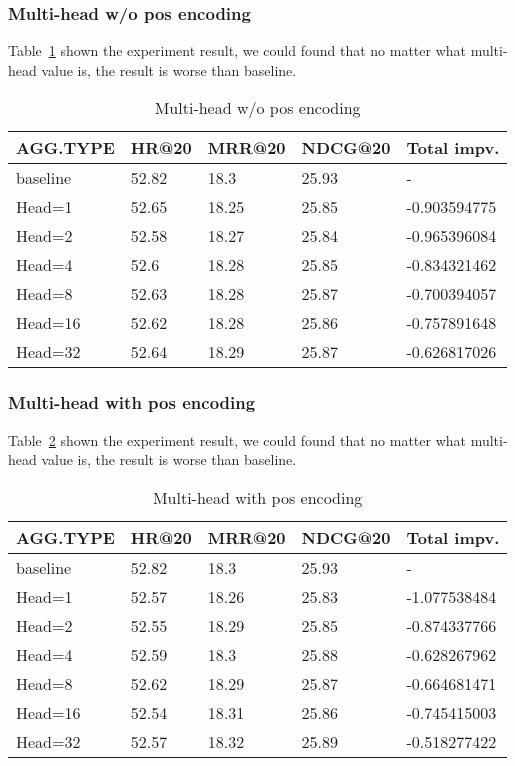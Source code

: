 \documentclass{article}
\begin{document}
\subsubsection{Multi-head w/o pos encoding}

Table~\ref{Multi-head w/o pos encoding} shown the experiment result,
we could found that no matter what multi-head value is,
the result is worse than baseline.

\begin{table}
    \caption{Multi-head w/o pos encoding}
    \label{Multi-head w/o pos encoding}
    \centering
    \begin{tabular}{lllll}
        \toprule
        AGG.TYPE & HR@20 & MRR@20 & NDCG@20 & Total impv.  \\
        \midrule
        baseline & 52.82 & 18.3   & 25.93   & -            \\
        Head=1   & 52.65 & 18.25  & 25.85   & -0.903594775 \\
        Head=2   & 52.58 & 18.27  & 25.84   & -0.965396084 \\
        Head=4   & 52.6  & 18.28  & 25.85   & -0.834321462 \\
        Head=8   & 52.63 & 18.28  & 25.87   & -0.700394057 \\
        Head=16  & 52.62 & 18.28  & 25.86   & -0.757891648 \\
        Head=32  & 52.64 & 18.29  & 25.87   & -0.626817026 \\
        \bottomrule
    \end{tabular}
\end{table}

\subsubsection{Multi-head with pos encoding}

Table~\ref{Multi-head with pos encoding} shown the experiment result,
we could found that no matter what multi-head value is,
the result is worse than baseline.

\begin{table}
    \caption{Multi-head with pos encoding}
    \label{Multi-head with pos encoding}
    \centering
    \begin{tabular}{lllll}
        \toprule
        AGG.TYPE & HR@20 & MRR@20 & NDCG@20 & Total impv.  \\
        \midrule
        baseline & 52.82 & 18.3   & 25.93   & -            \\
        Head=1   & 52.57 & 18.26  & 25.83   & -1.077538484 \\
        Head=2   & 52.55 & 18.29  & 25.85   & -0.874337766 \\
        Head=4   & 52.59 & 18.3   & 25.88   & -0.628267962 \\
        Head=8   & 52.62 & 18.29  & 25.87   & -0.664681471 \\
        Head=16  & 52.54 & 18.31  & 25.86   & -0.745415003 \\
        Head=32  & 52.57 & 18.32  & 25.89   & -0.518277422 \\
        \bottomrule
    \end{tabular}
\end{table}
\end{document}
